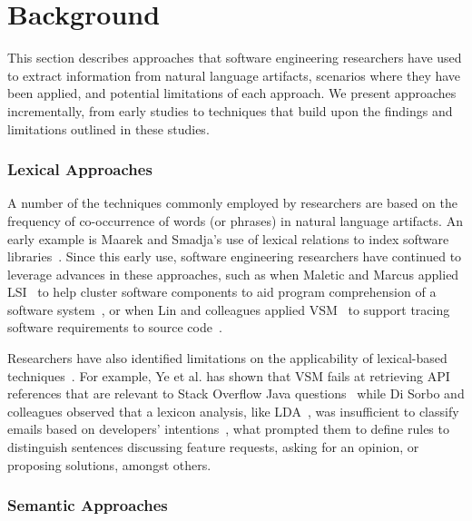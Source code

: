 \clearpage

\section{Background}
\label{cp5:background}


This section describes approaches that software engineering researchers have used to extract information from natural language artifacts, scenarios where they have been applied, and potential limitations of each approach. We present approaches incrementally, from early studies to techniques that build upon the findings
and limitations outlined in these studies.



\subsubsection{Lexical Approaches}


A number of the techniques commonly employed by researchers are based on the
frequency of co-occurrence of words (or phrases) in natural language artifacts. 
An early example is Maarek and Smadja's use of lexical relations to index
software libraries~\cite{maarek1989}. 
Since this early use, software engineering
researchers have continued to leverage advances in
these approaches, such as when 
Maletic and Marcus applied \acf{LSI}~\cite{deerwester1990LSI} to help cluster software components to aid
program comprehension of a software system~\cite{Marcus2003}, or when Lin and colleagues
applied \acf{VSM}~\cite{salton1975vector}
to support tracing software requirements to source code~\cite{Lin2021}.



Researchers have also identified limitations on the applicability of lexical-based techniques~\cite{silva2019, Ye2016, Sorbo2015}. For example, Ye et al. has shown that \acs{VSM} 
fails at retrieving API references that are relevant to Stack Overflow Java questions~\cite{Ye2016} while
Di Sorbo and colleagues observed that a lexicon analysis, like \acs{LDA}~\cite{blei2003latent}, was insufficient to classify emails based on developers' intentions~\cite{Sorbo2015}, what prompted them 
to define rules to
distinguish sentences discussing feature requests, asking for an
opinion, or proposing solutions, amongst others.



\subsubsection{Semantic Approaches}




